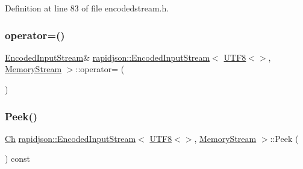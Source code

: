 Definition at line 83 of file encodedstream.\+h.


\begin{DoxyCode}{0}

\end{DoxyCode}
\mbox{\label{classrapidjson_1_1_encoded_input_stream_3_01_u_t_f8_3_4_00_01_memory_stream_01_4_a2b9dea1e14246ac134297b3006ea7275}} 
\subsubsection{\texorpdfstring{operator=()}{operator=()}}
{\footnotesize\ttfamily \mbox{\hyperlink{classrapidjson_1_1_encoded_input_stream}{Encoded\+Input\+Stream}}\& \mbox{\hyperlink{classrapidjson_1_1_encoded_input_stream}{rapidjson\+::\+Encoded\+Input\+Stream}}$<$ \mbox{\hyperlink{structrapidjson_1_1_u_t_f8}{U\+T\+F8}}$<$$>$, \mbox{\hyperlink{structrapidjson_1_1_memory_stream}{Memory\+Stream}} $>$\+::operator= (\begin{DoxyParamCaption}\item[{const \mbox{\hyperlink{classrapidjson_1_1_encoded_input_stream}{Encoded\+Input\+Stream}}$<$ \mbox{\hyperlink{structrapidjson_1_1_u_t_f8}{U\+T\+F8}}$<$$>$, \mbox{\hyperlink{structrapidjson_1_1_memory_stream}{Memory\+Stream}} $>$ \&}]{ }\end{DoxyParamCaption})\hspace{0.3cm}{\ttfamily [private]}}

\mbox{\label{classrapidjson_1_1_encoded_input_stream_3_01_u_t_f8_3_4_00_01_memory_stream_01_4_a4fc3d22ee4c1516066883546c1462c70}} 
\subsubsection{\texorpdfstring{Peek()}{Peek()}}
{\footnotesize\ttfamily \mbox{\hyperlink{classrapidjson_1_1_encoded_input_stream_3_01_u_t_f8_3_4_00_01_memory_stream_01_4_a907f1851cfe76ae1c3eb9e2074bfa507}{Ch}} \mbox{\hyperlink{classrapidjson_1_1_encoded_input_stream}{rapidjson\+::\+Encoded\+Input\+Stream}}$<$ \mbox{\hyperlink{structrapidjson_1_1_u_t_f8}{U\+T\+F8}}$<$$>$, \mbox{\hyperlink{structrapidjson_1_1_memory_stream}{Memory\+Stream}} $>$\+::Peek (\begin{DoxyParamCaption}{ }\end{DoxyParamCaption}) const}



